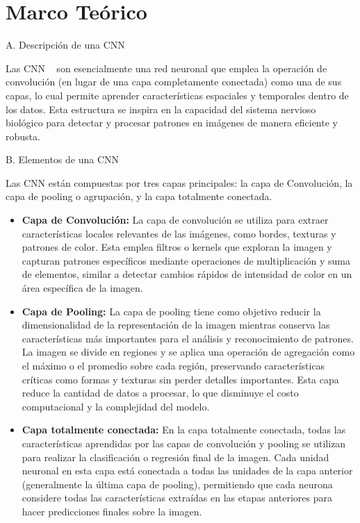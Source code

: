 \documentclass[conference, spanish, english]{IEEEtran}
\begin{document}
\section{Marco Teórico}
 
\begin{center}
    A. Descripción de una CNN
\end{center}

Las CNN ~\cite{Ketkar2021} son esencialmente una red neuronal que emplea la operación de convolución (en lugar de una capa completamente conectada) como una de sus capas, lo cual permite aprender características espaciales y temporales dentro de los datos. Esta estructura se inspira en la capacidad del sistema nervioso biológico para detectar y procesar patrones en imágenes de manera eficiente y robusta.
\begin{center}
    B. Elementos de una CNN
\end{center}

Las CNN están compuestas por tres capas principales: la capa de Convolución, la capa de pooling o agrupación, y la capa totalmente conectada.

\begin{itemize}
 \item \textbf{Capa de Convolución:} La capa de convolución se utiliza para extraer características locales relevantes de las imágenes, como bordes, texturas y patrones de color. Esta emplea filtros o kernels que exploran la imagen y capturan patrones específicos mediante operaciones de multiplicación y suma de elementos, similar a detectar cambios rápidos de intensidad de color en un área específica de la imagen.
 
 \item \textbf{Capa de Pooling:} La capa de pooling tiene como objetivo reducir la dimensionalidad de la representación de la imagen mientras conserva las características más importantes para el análisis y reconocimiento de patrones. La imagen se divide en regiones y se aplica una operación de agregación como el máximo o el promedio sobre cada región, preservando características críticas como formas y texturas sin perder detalles importantes. Esta capa reduce la cantidad de datos a procesar, lo que disminuye el costo computacional y la complejidad del modelo.
 
 \item \textbf{Capa totalmente conectada:} En la capa totalmente conectada, todas las características aprendidas por las capas de convolución y pooling se utilizan para realizar la clasificación o regresión final de la imagen. Cada unidad neuronal en esta capa está conectada a todas las unidades de la capa anterior (generalmente la última capa de pooling), permitiendo que cada neurona considere todas las características extraídas en las etapas anteriores para hacer predicciones finales sobre la imagen.
 
\end{itemize}
\end{document}
